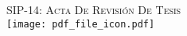 
\newpage
\thispagestyle{empty}
\begin{center}
	\vspace*{\fill}


	\Large\textsc{SIP-14: Acta De Revisión De Tesis}\\[0.2cm]
  \texttt{[image: pdf\_file\_icon.pdf]}

	\vspace*{\fill}

\end{center}
\cleardoublepage
